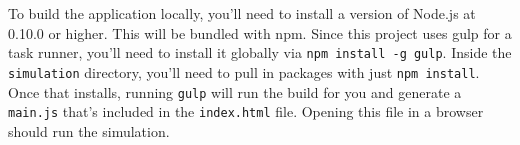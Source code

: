 \documentclass[a4paper,12pt]{article}
\begin{document}
To build the application locally, you'll need to install a version of Node.js \cite{nodejs} at 0.10.0 or higher. This will be bundled
with npm. Since this project uses gulp for a task runner, you'll need to install it globally via
\texttt{npm install -g gulp}. Inside the \texttt{simulation} directory, you'll need to pull in packages with just
\texttt{npm install}. Once that installs, running \texttt{gulp} will run the build for you and generate a
\texttt{main.js} that's included in the \texttt{index.html} file. Opening this file in a browser should run the
simulation.



\end{document}
